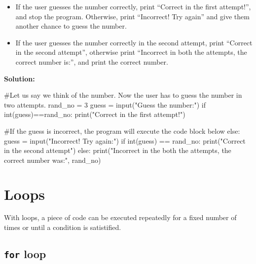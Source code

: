 \documentclass[
  letterpaper,
  DIV=11,
  numbers=noendperiod]{scrreprt}
\newenvironment{Shaded}{\begin{snugshade}}{\end{snugshade}}
\newcommand{\BuiltInTok}[1]{\textcolor[rgb]{0.00,0.23,0.31}{#1}}
\newcommand{\CommentTok}[1]{\textcolor[rgb]{0.37,0.37,0.37}{#1}}
\newcommand{\ControlFlowTok}[1]{\textcolor[rgb]{0.00,0.23,0.31}{#1}}
\newcommand{\DecValTok}[1]{\textcolor[rgb]{0.68,0.00,0.00}{#1}}
\newcommand{\NormalTok}[1]{\textcolor[rgb]{0.00,0.23,0.31}{#1}}
\newcommand{\OperatorTok}[1]{\textcolor[rgb]{0.37,0.37,0.37}{#1}}
\newcommand{\StringTok}[1]{\textcolor[rgb]{0.13,0.47,0.30}{#1}}
\providecommand{\tightlist}{%
  \setlength{\itemsep}{0pt}\setlength{\parskip}{0pt}}\usepackage{longtable,booktabs,array}
\begin{document}
\begin{itemize}
\tightlist
\item
  If the user guesses the number correctly, print ``Correct in the first
  attempt!'', and stop the program. Otherwise, print ``Incorrect! Try
  again'' and give them another chance to guess the number.
\item
  If the user guesses the number correctly in the second attempt, print
  ``Correct in the second attempt'', otherwise print ``Incorrect in both
  the attempts, the correct number is:'', and print the correct number.
\end{itemize}

\textbf{Solution:}

\begin{Shaded}
\begin{Highlighting}[]
\CommentTok{\#Let us say we think of the number. Now the user has to guess the number in two attempts.}
\NormalTok{rand\_no }\OperatorTok{=} \DecValTok{3}
\NormalTok{guess }\OperatorTok{=} \BuiltInTok{input}\NormalTok{(}\StringTok{"Guess the number:"}\NormalTok{)}
\ControlFlowTok{if} \BuiltInTok{int}\NormalTok{(guess)}\OperatorTok{==}\NormalTok{rand\_no:}
    \BuiltInTok{print}\NormalTok{(}\StringTok{"Correct in the first attempt!"}\NormalTok{)}
    
\CommentTok{\#If the guess is incorrect, the program will execute the code block below    }
\ControlFlowTok{else}\NormalTok{:    }
\NormalTok{    guess }\OperatorTok{=} \BuiltInTok{input}\NormalTok{(}\StringTok{"Incorrect! Try again:"}\NormalTok{)}
    \ControlFlowTok{if} \BuiltInTok{int}\NormalTok{(guess) }\OperatorTok{==}\NormalTok{ rand\_no:}
        \BuiltInTok{print}\NormalTok{(}\StringTok{"Correct in the second attempt"}\NormalTok{)}
    \ControlFlowTok{else}\NormalTok{:}
        \BuiltInTok{print}\NormalTok{(}\StringTok{"Incorrect in the both the attempts, the correct number was:"}\NormalTok{, rand\_no)}
\end{Highlighting}
\end{Shaded}

\hypertarget{loops}{%
\section{Loops}\label{loops}}

With loops, a piece of code can be executed repeatedly for a fixed
number of times or until a condition is satistified.

\hypertarget{for-loop}{%
\subsection{\texorpdfstring{\texttt{for}
loop}{for loop}}\label{for-loop}}
\end{document}
